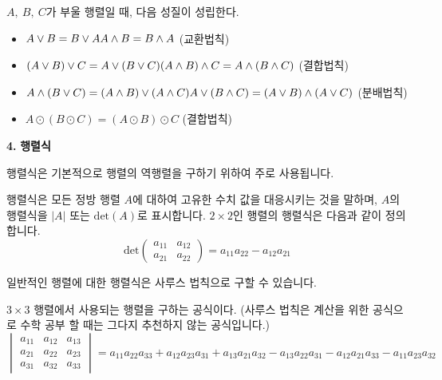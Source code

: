 \begin{tcolorbox}[colback = white, colframe = Theorem, title = \textmd{정리: 부울 행렬의 성질}]
    $A, \ B, \ C$가 부울 행렬일 때, 다음 성질이 성립한다.
    \begin{itemize}
        \item $A \vee B = B \vee A \\ A \wedge B = B \wedge A  $ (교환법칙)
        \item $(A \vee B ) \vee C = A \vee (B\vee C) \\ (A \wedge B ) \wedge C = A \wedge (B\wedge C)$ (결합법칙)
        \item $A \wedge (B\vee C) = (A \wedge B) \vee (A \wedge C) \\ A \vee (B\wedge C) = (A \vee B) \wedge (A \vee C) $ (분배법칙)
        \item $A \odot (B \odot C)= (A \odot B) \odot C$ (결합법칙)
    \end{itemize}
\end{tcolorbox}

\newpage
\begin{flushleft}
    {\setmainfont[Path=FONT/]{KOPUBWORLD_DOTUM_PRO_BOLD.OTF} {\textcolor{header}{{\huge\textbf{4.}}}}}
    { {\textcolor{header}{{\huge\textbf{행렬식}}}}}
\end{flushleft}

\begin{flushleft}
    행렬식은 기본적으로 행렬의 역행렬을 구하기 위하여 주로 사용됩니다.
\end{flushleft}

\begin{tcolorbox}[colback = white, colframe = Definition, title = \textmd{정의: 행렬식}]
    행렬식은 모든 정방 행렬 $A$에 대하여 고유한 수치 값을 대응시키는 것을 말하며, $A$의 행렬식을 $\lvert A \rvert$ 또는 $\text{det}(A)$로 표시합니다.
    $2\times 2$인 행렬의 행렬식은 다음과 같이 정의합니다.
    \[ \text{det}\begin{pmatrix} a_{11} & a_{12} \\ a_{21} & a_{22}
    \end{pmatrix} = a_{11}a_{22} - a_{12}a_{21} \]
\end{tcolorbox}

\begin{flushleft}
    일반적인 행렬에 대한 행렬식은 사루스 법칙으로 구할 수 있습니다.
\end{flushleft}

\begin{tcolorbox}[colback = white, colframe = Theorem, title = \textmd{정리: 사루스 법칙}]
    $3 \times 3$ 행렬에서 사용되는 행렬을 구하는 공식이다. (사루스 법칙은 계산을 위한 공식으로 수학 공부 할 때는 그다지 추천하지 않는 공식입니다.)
    \[ \begin{vmatrix} a_{11} & a_{12} & a_{13} \\ a_{21} & a_{22} & a_{23} \\ a_{31} & a_{32} & a_{33}
    \end{vmatrix} = a_{11}a_{22}a_{33} + a_{12}a_{23}a_{31} + a_{13}a_{21}a_{32} - a_{13}a_{22}a_{31} - a_{12}a_{21}a_{33} - a_{11}a_{23}a_{32} \]
\end{tcolorbox}

